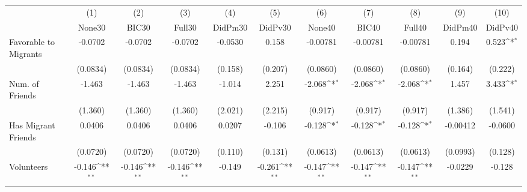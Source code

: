 {
\def\sym#1{\ifmmode^{#1}\else\(^{#1}\)\fi}
\begin{tabular}{l*{10}{c}}
\toprule
            &\multicolumn{1}{c}{(1)}&\multicolumn{1}{c}{(2)}&\multicolumn{1}{c}{(3)}&\multicolumn{1}{c}{(4)}&\multicolumn{1}{c}{(5)}&\multicolumn{1}{c}{(6)}&\multicolumn{1}{c}{(7)}&\multicolumn{1}{c}{(8)}&\multicolumn{1}{c}{(9)}&\multicolumn{1}{c}{(10)}\\
            &\multicolumn{1}{c}{None30}&\multicolumn{1}{c}{BIC30}&\multicolumn{1}{c}{Full30}&\multicolumn{1}{c}{DidPm30}&\multicolumn{1}{c}{DidPv30}&\multicolumn{1}{c}{None40}&\multicolumn{1}{c}{BIC40}&\multicolumn{1}{c}{Full40}&\multicolumn{1}{c}{DidPm40}&\multicolumn{1}{c}{DidPv40}\\
\midrule
Favorable to Migrants&     -0.0702         &     -0.0702         &     -0.0702         &     -0.0530         &       0.158         &    -0.00781         &    -0.00781         &    -0.00781         &       0.194         &       0.523\sym{*}  \\
            &    (0.0834)         &    (0.0834)         &    (0.0834)         &     (0.158)         &     (0.207)         &    (0.0860)         &    (0.0860)         &    (0.0860)         &     (0.164)         &     (0.222)         \\
\addlinespace
Num. of Friends&      -1.463         &      -1.463         &      -1.463         &      -1.014         &       2.251         &      -2.068\sym{*}  &      -2.068\sym{*}  &      -2.068\sym{*}  &       1.457         &       3.433\sym{*}  \\
            &     (1.360)         &     (1.360)         &     (1.360)         &     (2.021)         &     (2.215)         &     (0.917)         &     (0.917)         &     (0.917)         &     (1.386)         &     (1.541)         \\
\addlinespace
Has Migrant Friends&      0.0406         &      0.0406         &      0.0406         &      0.0207         &      -0.106         &      -0.128\sym{*}  &      -0.128\sym{*}  &      -0.128\sym{*}  &    -0.00412         &     -0.0600         \\
            &    (0.0720)         &    (0.0720)         &    (0.0720)         &     (0.110)         &     (0.131)         &    (0.0613)         &    (0.0613)         &    (0.0613)         &    (0.0993)         &     (0.128)         \\
\addlinespace
Volunteers  &      -0.146\sym{**} &      -0.146\sym{**} &      -0.146\sym{**} &      -0.149         &      -0.261\sym{**} &      -0.147\sym{**} &      -0.147\sym{**} &      -0.147\sym{**} &     -0.0229         &      -0.128         \\

\end{tabular}}
